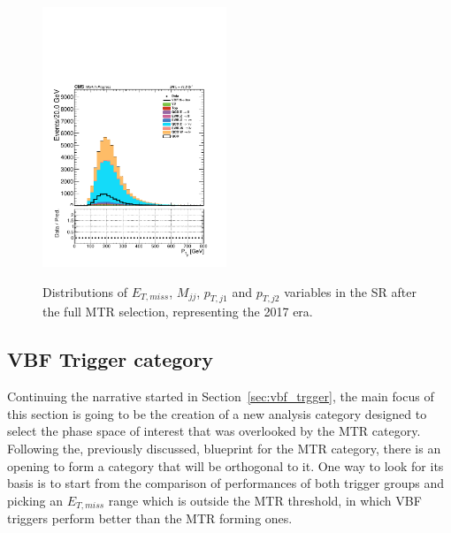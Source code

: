 \begin{figure}[htbp]
{    \includegraphics[width=0.49\textwidth]{Analysis_strategy/MTR_2017_SR/Leading_jet_pt.pdf}
    }
  \caption{Distributions of $E_{T,miss}$, $M_{jj}$, $p_{T,j1}$ and $p_{T,j2}$ variables in the SR after the full MTR selection, representing the 2017 era.}
  \label{fig:sr_n-1_shapes_2}
\end{figure}







\subsection{VBF Trigger category}
\label{subsec:vtr_selection}
\hspace{10pt} Continuing the narrative started in Section~\ref{sec:vbf_trgger}, the main focus of this section is going to be the creation of a new analysis category designed to select the phase space of interest that was overlooked by the MTR category. Following the, previously discussed, blueprint for the MTR category, there is an opening to form a category that will be orthogonal to it. One way to look for its basis is to start from the comparison of performances of both trigger groups and picking an $E_{T,miss}$ range which is outside the MTR threshold, in which VBF triggers perform better than the MTR forming ones. 

